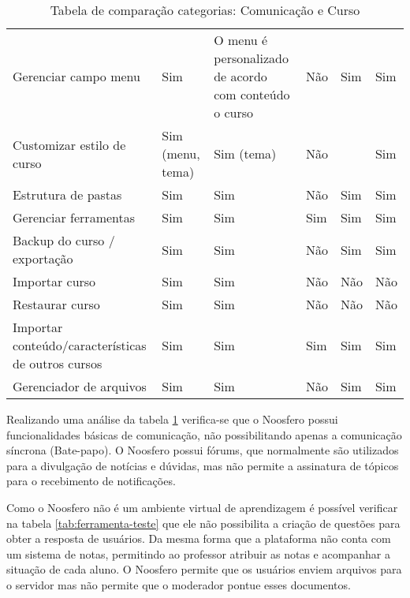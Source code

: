 \begin{table}[h]
\begin{landscape}
\begin{tabular}{@{}p{5cm}|p{3.5cm}|p{3.5cm}|p{2.5cm}|p{2.5cm}|p{3.5cm}@{}}
Gerenciar campo menu  & Sim & O menu é personalizado de acordo com conteúdo o curso & Não& Sim   & Sim    \\
Customizar estilo de curso & Sim (menu, tema) & Sim (tema)& Não&  & Sim\\
Estrutura de pastas   & Sim & Sim & Não& Sim   & Sim    \\
Gerenciar ferramentas & Sim & Sim & Sim& Sim   & Sim    \\
Backup do curso / exportação & Sim & Sim & Não& Sim   & Sim\\
Importar curso& Sim & Sim & Não& Não   & Não \\
Restaurar curso & Sim & Sim & Não& Não   & Não    \\
Importar conteúdo/características de outros cursos   & Sim & Sim & Sim & Sim   & Sim    \\
Gerenciador de arquivos    & Sim & Sim & Não& Sim   & Sim
\end{tabular}
\end{landscape}
\caption{Tabela de comparação categorias: Comunicação e Curso}
\label{tab:comunicacao-curso}
\end{table}

Realizando uma análise da tabela \ref{tab:comunicacao-curso} verifica-se que o Noosfero possui funcionalidades básicas de comunicação, não possibilitando apenas a comunicação síncrona (Bate-papo). O Noosfero possui fórums, que normalmente são utilizados para a divulgação de notícias e dúvidas, mas não permite a assinatura de tópicos para o recebimento de notificações.

Como o Noosfero não é um ambiente virtual de aprendizagem é possível verificar na tabela \ref{tab:ferramenta-teste} que ele não possibilita a criação de questões para obter a resposta de usuários. Da mesma forma que a plataforma não conta com um sistema de notas, permitindo ao professor atribuir as notas e acompanhar a situação de cada aluno. O Noosfero permite que os usuários enviem arquivos para o servidor mas não permite que o moderador pontue esses documentos.

